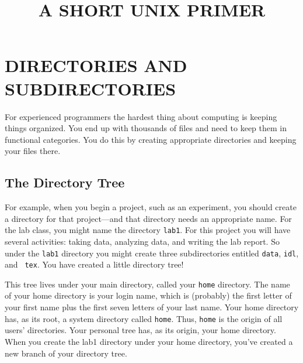 \documentclass[]{article}
\begin{document}
\title{A SHORT UNIX PRIMER}


\tableofcontents

\section{DIRECTORIES AND SUBDIRECTORIES} \label{directories}

For experienced programmers the hardest thing about computing is keeping
things organized. You end up with thousands of files and need to keep
them in functional categories. You do this by creating appropriate
directories and keeping your files there. 

\subsection{The Directory Tree}\label{thedirtree}

For example, when you begin a project, such as an experiment, you should
create a directory for that project---and that directory needs an
appropriate name. For the lab class, you might name the directory
{\tt lab1}. For this project
you will have several activities: taking data, analyzing data, and
writing the lab report. So under the {\tt lab1} directory you might
create three subdirectories entitled {\tt data}, {\tt idl}, and {\tt
  tex}. You have created a little directory tree!

This tree lives under your main directory, called your {\tt home}
directory. The name of your home directory is your login name, which is
(probably) the first letter of your first name plus the first seven
letters of your last name. Your home directory has, as its root, a
system directory called {\tt home}. Thus, {\tt home} is the origin of
all users' directories. Your personal tree has, as its origin, your home
directory. When you create the lab1 directory under your home directory,
you've created a new branch of your directory tree.
\end{document}
